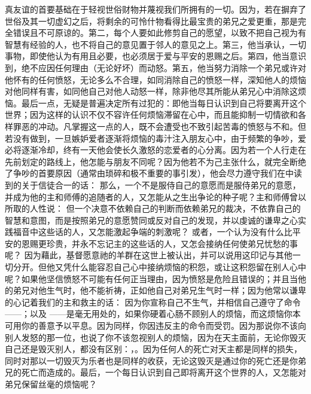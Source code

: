 真友谊的首要基础在于轻视世俗财物并蔑视我们所拥有的一切。因为，若在摒弃了世俗及其一切虚幻之后，将剩余的可怜什物看得比最宝贵的弟兄之爱更重，那是完全错误且不可原谅的。第二，每个人要如此修剪自己的愿望，以致不把自己视为有智慧有经验的人，也不将自己的意见置于邻人的意见之上。第三，他当承认，一切事物，即使他认为有用且必要，也必须居于爱与平安的恩赐之后。第四，他当意识到，绝不应因任何理由（无论好坏）而动怒。第五，他当努力消除一个弟兄或许对他怀有的任何愤怒，无论多么不合理，如同消除自己的愤怒一样，深知他人的烦恼对他同样有害，如同他自己对他人动怒一样，除非他尽其所能从弟兄心中消除这烦恼。最后一点，无疑是普遍决定所有过犯的：即他当每日认识到自己将要离开这个世界；因为这样的认识不仅不容许任何烦恼滞留在心中，而且能抑制一切情欲和各样罪恶的冲动。凡掌握这一点的人，既不会遭受也不致引起苦毒的愤怒与不和。但若没有做到，一旦嫉妒爱者逐渐将烦恼的毒汁注入朋友心中，由于频繁的争吵，爱必将逐渐冷却，终有一天他会使长久激怒的恋爱者的心分离。因为若一个人行走在先前划定的路线上，他怎能与朋友不同呢？因为他若不为己主张什么，就完全断绝了争吵的首要原因（通常由琐碎和极不重要的事引发），他会尽力遵守我们在中读到的关于信徒合一的话：  那么，一个不是服侍自己的意愿而是服侍弟兄的意愿，并成为他的主和师傅的追随者的人，又怎能从之生出争论的种子呢？主和师傅曾以所取的人性说：  但一个决意不依赖自己的判断而依赖弟兄的裁决，不依靠自己的智慧和意图，而是按照弟兄的意愿赞同或反对自己的发现，并以虔诚的谦卑之心实践福音中这些话的人，又怎能激起争端的刺激呢？  或者，一个认为没有什么比平安的恩赐更珍贵，并永不忘记主的这些话的人，又怎会接纳任何使弟兄忧愁的事呢？  因为藉此，基督愿意祂的羊群在这世上被认出，并可以说用这印记与其他一切分开。但他又凭什么能容忍自己心中接纳烦恼的积怨，或让这积怨留在别人心中呢？如果他坚信愤怒不可能有任何正当理由，因为愤怒是危险且错误的；并且当他的弟兄对他生气时，他不能祈祷，正如他自己对弟兄生气时一样；因为他常以谦卑的心记着我们的主和救主的话：  因为你宣称自己不生气，并相信自己遵守了命令——；以及 ——是毫无用处的，如果你硬着心肠不顾别人的烦恼，而这烦恼你本可用你的善意予以平息。因为同样，你因违反主的命令而受罚。因为那说你不该向别人发怒的那一位，也说了你不该忽视别人的烦恼，因为在天主面前，无论你毁灭自己还是毁灭别人，都没有区别：，。因为任何人的死亡对天主都是同样的损失，同时对那以一切毁灭为乐者也是同样的收获，无论这毁灭是通过你的死亡还是你弟兄的死亡而造成的。最后，一个每日认识到自己即将离开这个世界的人，又怎能对弟兄保留丝毫的烦恼呢？\par

